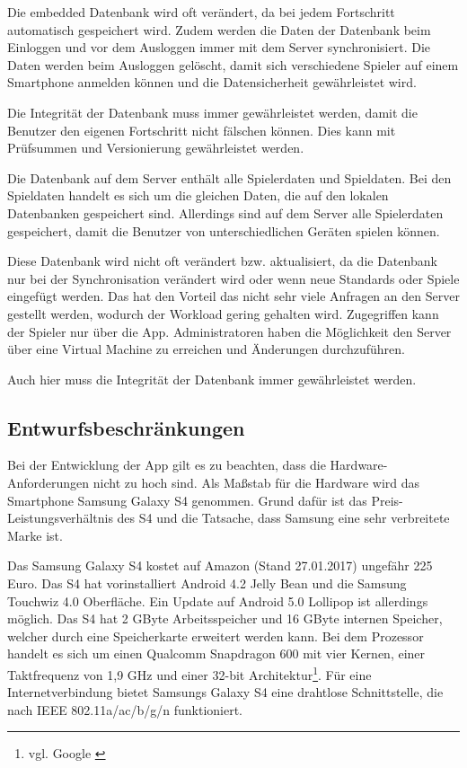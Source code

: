 		Die embedded Datenbank wird oft verändert, da bei jedem Fortschritt automatisch gespeichert wird. Zudem werden die Daten der Datenbank beim Einloggen und vor dem Ausloggen immer mit dem Server synchronisiert. Die Daten werden beim Ausloggen gelöscht, damit sich verschiedene Spieler auf einem Smartphone anmelden können und die Datensicherheit gewährleistet wird.
		
		Die Integrität der Datenbank muss immer gewährleistet werden, damit die Benutzer den eigenen Fortschritt nicht fälschen können. Dies kann mit Prüfsummen und Versionierung gewährleistet werden.
		
		Die Datenbank auf dem Server enthält alle Spielerdaten und Spieldaten. Bei den Spieldaten handelt es sich um die gleichen Daten, die auf den lokalen Datenbanken gespeichert sind. Allerdings sind auf dem Server alle Spielerdaten gespeichert, damit die Benutzer von unterschiedlichen Geräten spielen können. 
		
		Diese Datenbank wird nicht oft verändert bzw. aktualisiert, da die Datenbank nur bei der Synchronisation verändert wird oder wenn neue Standards oder Spiele eingefügt werden. Das hat den Vorteil das nicht sehr viele Anfragen an den Server gestellt werden, wodurch der Workload gering gehalten wird. Zugegriffen kann der Spieler nur über die App. Administratoren haben die Möglichkeit den Server über eine Virtual Machine zu erreichen und Änderungen durchzuführen. 
		
		Auch hier muss die Integrität der Datenbank immer gewährleistet werden.
	
	\subsection{Entwurfsbeschränkungen}
		Bei der Entwicklung der App gilt es zu beachten, dass die Hardware-Anforderungen nicht zu hoch sind. Als Maßstab für die Hardware wird das Smartphone Samsung Galaxy S4 genommen. Grund dafür ist das Preis-Leistungsverhältnis des S4 und die Tatsache, dass Samsung eine sehr verbreitete Marke ist.
		
		Das Samsung Galaxy S4 kostet auf Amazon (Stand 27.01.2017) ungefähr 225 Euro. Das S4 hat vorinstalliert Android 4.2 Jelly Bean und die Samsung Touchwiz 4.0 Oberfläche. Ein Update auf Android 5.0 Lollipop ist allerdings möglich. Das S4 hat 2 GByte Arbeitsspeicher und 16 GByte internen Speicher, welcher durch eine Speicherkarte erweitert werden kann. Bei dem Prozessor handelt es sich um einen Qualcomm Snapdragon 600 mit vier Kernen, einer Taktfrequenz von 1,9 GHz und einer 32-bit Architektur\footnote{vgl. Google \cite{s4Google}}. Für eine Internetverbindung bietet Samsungs Galaxy S4 eine drahtlose Schnittstelle, die nach IEEE 802.11a/ac/b/g/n funktioniert.
		
